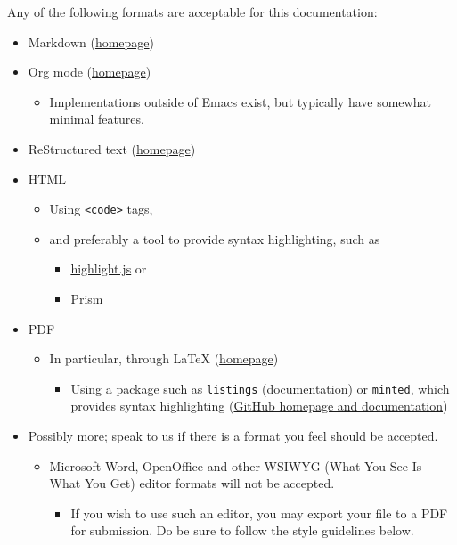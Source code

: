 \documentclass[11pt]{article}
\begin{document}
Any of the following formats are acceptable for this documentation:
\begin{itemize}
\item Markdown (\href{https://daringfireball.net/projects/markdown/}{homepage})
\item Org mode (\href{https://orgmode.org/}{homepage})
\begin{itemize}
\item Implementations outside of Emacs exist,
but typically have somewhat minimal features.
\end{itemize}
\item ReStructured text (\href{https://docutils.sourceforge.io/rst.html}{homepage})
\item HTML
\begin{itemize}
\item Using \texttt{<code>} tags,
\item and preferably a tool to provide syntax highlighting,
such as
\begin{itemize}
\item \href{https://highlightjs.org/usage/}{highlight.js} or
\item \href{https://prismjs.com/\#basic-usage}{Prism}
\end{itemize}
\end{itemize}
\item PDF
\begin{itemize}
\item In particular, through \LaTeX{} (\href{https://www.latex-project.org/}{homepage})
\begin{itemize}
\item Using a package such as \texttt{listings}
(\href{https://en.wikibooks.org/wiki/LaTeX/Source\_Code\_Listings}{documentation})
or \texttt{minted}, which provides syntax highlighting
(\href{https://github.com/gpoore/minted}{GitHub homepage and documentation})
\end{itemize}
\end{itemize}
\item Possibly more; speak to us if there is a format you feel
should be accepted.
\begin{itemize}
\item Microsoft Word, OpenOffice and other WSIWYG
(What You See Is What You Get)
editor formats will not be accepted.
\begin{itemize}
\item If you wish to use such an editor, you may export
your file to a PDF for submission.
Do be sure to follow the style guidelines below.
\end{itemize}
\end{itemize}
\end{itemize}
\end{document}
